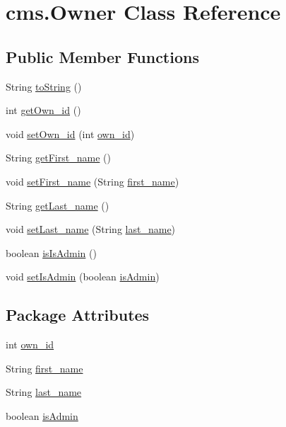 \hypertarget{classcms_1_1_owner}{}\section{cms.\+Owner Class Reference}
\label{classcms_1_1_owner}
\subsection*{Public Member Functions}
\begin{DoxyCompactItemize}
\item 
String \mbox{\hyperlink{classcms_1_1_owner_ac6c87a73c65314673d777c86c5f0faac}{to\+String}} ()
\item 
int \mbox{\hyperlink{classcms_1_1_owner_a0e8efb657a36696ad36e06eb0788b13d}{get\+Own\+\_\+id}} ()
\item 
void \mbox{\hyperlink{classcms_1_1_owner_a422cd6b9649baddab39c732a072f5f71}{set\+Own\+\_\+id}} (int \mbox{\hyperlink{classcms_1_1_owner_ae84bad6a2ff834a9f2b3fe6ea23c7192}{own\+\_\+id}})
\item 
String \mbox{\hyperlink{classcms_1_1_owner_ad41e0dae9e90756dd8ed05f1814aa9d9}{get\+First\+\_\+name}} ()
\item 
void \mbox{\hyperlink{classcms_1_1_owner_ab78b9ff6d0cd42b630552d2c3019f0fc}{set\+First\+\_\+name}} (String \mbox{\hyperlink{classcms_1_1_owner_a1cae339c355e6861c6d257004a654b1c}{first\+\_\+name}})
\item 
String \mbox{\hyperlink{classcms_1_1_owner_a7891858f4cd95eee2813af923ad907f1}{get\+Last\+\_\+name}} ()
\item 
void \mbox{\hyperlink{classcms_1_1_owner_a792b7b26d6e10486874eea66a8d01f87}{set\+Last\+\_\+name}} (String \mbox{\hyperlink{classcms_1_1_owner_a0e60226c1b9f367b9fcff9e41adece5e}{last\+\_\+name}})
\item 
boolean \mbox{\hyperlink{classcms_1_1_owner_ad7a506aa6c280629b6f5eeaa84aab1bd}{is\+Is\+Admin}} ()
\item 
void \mbox{\hyperlink{classcms_1_1_owner_a382b3d498d22ac601131a224724f61a8}{set\+Is\+Admin}} (boolean \mbox{\hyperlink{classcms_1_1_owner_a0437c5a1a3071521a64846b09c0c6f7e}{is\+Admin}})
\end{DoxyCompactItemize}
\subsection*{Package Attributes}
\begin{DoxyCompactItemize}
\item 
int \mbox{\hyperlink{classcms_1_1_owner_ae84bad6a2ff834a9f2b3fe6ea23c7192}{own\+\_\+id}}
\item 
String \mbox{\hyperlink{classcms_1_1_owner_a1cae339c355e6861c6d257004a654b1c}{first\+\_\+name}}
\item 
String \mbox{\hyperlink{classcms_1_1_owner_a0e60226c1b9f367b9fcff9e41adece5e}{last\+\_\+name}}
\item 
boolean \mbox{\hyperlink{classcms_1_1_owner_a0437c5a1a3071521a64846b09c0c6f7e}{is\+Admin}}
\end{DoxyCompactItemize}


